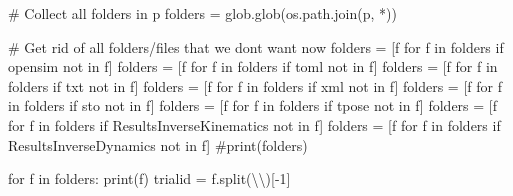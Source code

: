 \documentclass[
  letterpaper,
  DIV=11,
  numbers=noendperiod]{scrreprt}
\newenvironment{Shaded}{\begin{snugshade}}{\end{snugshade}}
\newcommand{\BuiltInTok}[1]{\textcolor[rgb]{0.00,0.23,0.31}{#1}}
\newcommand{\CharTok}[1]{\textcolor[rgb]{0.13,0.47,0.30}{#1}}
\newcommand{\CommentTok}[1]{\textcolor[rgb]{0.37,0.37,0.37}{#1}}
\newcommand{\ControlFlowTok}[1]{\textcolor[rgb]{0.00,0.23,0.31}{#1}}
\newcommand{\DecValTok}[1]{\textcolor[rgb]{0.68,0.00,0.00}{#1}}
\newcommand{\KeywordTok}[1]{\textcolor[rgb]{0.00,0.23,0.31}{#1}}
\newcommand{\NormalTok}[1]{\textcolor[rgb]{0.00,0.23,0.31}{#1}}
\newcommand{\OperatorTok}[1]{\textcolor[rgb]{0.37,0.37,0.37}{#1}}
\newcommand{\StringTok}[1]{\textcolor[rgb]{0.13,0.47,0.30}{#1}}
\begin{document}
\begin{Shaded}
\begin{Highlighting}[]
        \CommentTok{\# Collect all folders in p}
\NormalTok{        folders }\OperatorTok{=}\NormalTok{ glob.glob(os.path.join(p, }\StringTok{\textquotesingle{}*\textquotesingle{}}\NormalTok{))}

        \CommentTok{\# Get rid of all folders/files that we don\textquotesingle{}t want now}
\NormalTok{        folders }\OperatorTok{=}\NormalTok{ [f }\ControlFlowTok{for}\NormalTok{ f }\KeywordTok{in}\NormalTok{ folders }\ControlFlowTok{if} \StringTok{\textquotesingle{}opensim\textquotesingle{}} \KeywordTok{not} \KeywordTok{in}\NormalTok{ f]}
\NormalTok{        folders }\OperatorTok{=}\NormalTok{ [f }\ControlFlowTok{for}\NormalTok{ f }\KeywordTok{in}\NormalTok{ folders }\ControlFlowTok{if} \StringTok{\textquotesingle{}toml\textquotesingle{}} \KeywordTok{not} \KeywordTok{in}\NormalTok{ f]}
\NormalTok{        folders }\OperatorTok{=}\NormalTok{ [f }\ControlFlowTok{for}\NormalTok{ f }\KeywordTok{in}\NormalTok{ folders }\ControlFlowTok{if} \StringTok{\textquotesingle{}txt\textquotesingle{}} \KeywordTok{not} \KeywordTok{in}\NormalTok{ f]}
\NormalTok{        folders }\OperatorTok{=}\NormalTok{ [f }\ControlFlowTok{for}\NormalTok{ f }\KeywordTok{in}\NormalTok{ folders }\ControlFlowTok{if} \StringTok{\textquotesingle{}xml\textquotesingle{}} \KeywordTok{not} \KeywordTok{in}\NormalTok{ f]}
\NormalTok{        folders }\OperatorTok{=}\NormalTok{ [f }\ControlFlowTok{for}\NormalTok{ f }\KeywordTok{in}\NormalTok{ folders }\ControlFlowTok{if} \StringTok{\textquotesingle{}sto\textquotesingle{}} \KeywordTok{not} \KeywordTok{in}\NormalTok{ f]}
\NormalTok{        folders }\OperatorTok{=}\NormalTok{ [f }\ControlFlowTok{for}\NormalTok{ f }\KeywordTok{in}\NormalTok{ folders }\ControlFlowTok{if} \StringTok{\textquotesingle{}tpose\textquotesingle{}} \KeywordTok{not} \KeywordTok{in}\NormalTok{ f]}
\NormalTok{        folders }\OperatorTok{=}\NormalTok{ [f }\ControlFlowTok{for}\NormalTok{ f }\KeywordTok{in}\NormalTok{ folders }\ControlFlowTok{if} \StringTok{\textquotesingle{}ResultsInverseKinematics\textquotesingle{}} \KeywordTok{not} \KeywordTok{in}\NormalTok{ f]}
\NormalTok{        folders }\OperatorTok{=}\NormalTok{ [f }\ControlFlowTok{for}\NormalTok{ f }\KeywordTok{in}\NormalTok{ folders }\ControlFlowTok{if} \StringTok{\textquotesingle{}ResultsInverseDynamics\textquotesingle{}} \KeywordTok{not} \KeywordTok{in}\NormalTok{ f]}
        \CommentTok{\#print(folders)}

        \ControlFlowTok{for}\NormalTok{ f }\KeywordTok{in}\NormalTok{ folders:}
            \BuiltInTok{print}\NormalTok{(f)}
\NormalTok{            trialid }\OperatorTok{=}\NormalTok{ f.split(}\StringTok{\textquotesingle{}}\CharTok{\textbackslash{}\textbackslash{}}\StringTok{\textquotesingle{}}\NormalTok{)[}\OperatorTok{{-}}\DecValTok{1}\NormalTok{]}


\end{Highlighting}
\end{Shaded}
\end{document}
